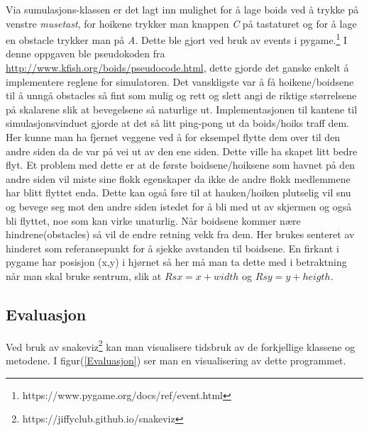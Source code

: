 {Via sumulasjons-klassen er det lagt inn mulighet for å lage boids ved å trykke på venstre \emph{musetast}, for hoikene trykker man knappen \emph{C} på tastaturet og for å lage en obstacle trykker man på \emph{A}. Dette ble gjort ved bruk av events i pygame.\footnote{https://www.pygame.org/docs/ref/event.html} 
I denne oppgaven ble pseudokoden fra \url{http://www.kfish.org/boids/pseudocode.html}, dette gjorde det ganske enkelt å implementere reglene for simulatoren. Det vanskligste var å få hoikene/boidsene til å unngå obstacles så fint som mulig og rett og slett angi de riktige størrelsene på skalarene slik at bevegelsene så naturlige ut. Implementasjonen til kantene til simulasjonsvinduet gjorde at det så litt ping-pong ut da boids/hoiks traff dem. Her kunne man ha fjernet veggene ved å for eksempel flytte dem over til den andre siden da de var på vei ut av den ene siden. Dette ville ha skapet litt bedre flyt. Et problem med dette er at de første boidsene/hoiksene som havnet på den andre siden vil miste sine flokk egenskaper da ikke de andre flokk medlemmene har blitt flyttet enda. Dette kan også føre til at hauken/hoiken plutselig vil snu og bevege seg mot den andre siden istedet for å bli med ut av skjermen og også bli flyttet, noe som kan virke unaturlig. Når boidsene kommer nære hindrene(obstacles) så vil de endre retning vekk fra dem. Her brukes senteret av hinderet som referansepunkt for å sjekke avstanden til boidsene. En firkant i pygame har posisjon (x,y) i hjørnet så her må man ta dette med i betraktning når man skal bruke sentrum, slik at $R{sx} = x + width$ og $R{sy} = y + heigth$.


\subsection{Evaluasjon}

Ved bruk av snakeviz\footnote{https://jiffyclub.github.io/snakeviz} kan man visualisere tidsbruk av de forkjellige klassene og metodene. I figur(\ref{Evaluasjon}) ser man en visualisering av dette programmet.

}
